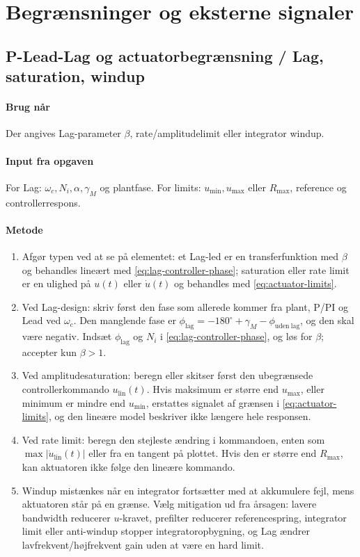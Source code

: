 \section{Begrænsninger og eksterne signaler}

\subsection{P-Lead-Lag og actuatorbegrænsning / Lag, saturation, windup}
\label{sec:limits}

\paragraph{Brug når}
Der angives Lag-parameter \(\beta\), rate/amplitudelimit eller integrator windup.

\paragraph{Input fra opgaven}
For Lag: \(\omega_c,N_i,\alpha,\gamma_M\) og plantfase. For limits:
\(u_{\min},u_{\max}\) eller \(R_{\max}\), reference og controllerrespons.

\paragraph{Metode}
\begin{enumerate}
\item Afgør typen ved at se på elementet: et Lag-led er en transferfunktion med
      \(\beta\) og behandles lineært med \eqref{eq:lag-controller-phase}; saturation
      eller rate limit er en ulighed på \(u(t)\) eller \(\dot u(t)\) og behandles med
      \eqref{eq:actuator-limits}.
\item Ved Lag-design: skriv først den fase som allerede kommer fra plant, P/PI og Lead
      ved \(\omega_c\). Den manglende fase er
      \(\phi_{\mathrm{lag}}=-180^\circ+\gamma_M-\phi_{\mathrm{uden\ lag}}\), og den
      skal være negativ. Indsæt \(\phi_{\mathrm{lag}}\) og \(N_i\) i
      \eqref{eq:lag-controller-phase}, og løs for \(\beta\); accepter kun \(\beta>1\).
\item Ved amplitudesaturation: beregn eller skitser først den ubegrænsede
      controllerkommando \(u_{\mathrm{lin}}(t)\). Hvis maksimum er større end
      \(u_{\max}\), eller minimum er mindre end \(u_{\min}\), erstattes signalet af
      grænsen i \eqref{eq:actuator-limits}, og den lineære model beskriver ikke længere
      hele responsen.
\item Ved rate limit: beregn den stejleste ændring i kommandoen, enten som
      \(\max|\dot u_{\mathrm{lin}}(t)|\) eller fra en tangent på plottet. Hvis den er
      større end \(R_{\max}\), kan aktuatoren ikke følge den lineære kommando.
\item Windup mistænkes når en integrator fortsætter med at akkumulere fejl, mens
      aktuatoren står på en grænse. Vælg mitigation ud fra årsagen: lavere bandwidth
      reducerer \(u\)-kravet, prefilter reducerer referencespring, integrator limit eller
      anti-windup stopper integratoropbygning, og Lag ændrer lavfrekvent/højfrekvent
      gain uden at være en hard limit.
\end{enumerate}

